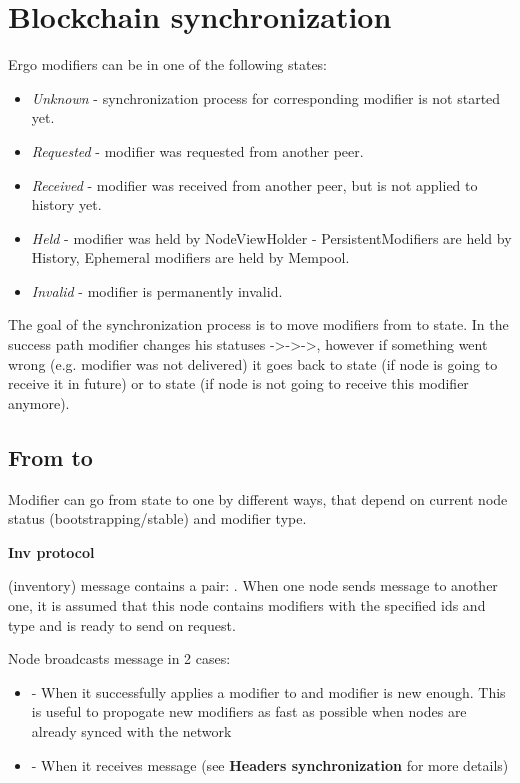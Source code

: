 
\section{Blockchain synchronization}

Ergo modifiers can be in one of the following states:

\begin{itemize}
    \item{\em Unknown} - synchronization process for corresponding modifier is not started yet.
    \item{\em Requested} - modifier was requested from another peer.
    \item{\em Received} - modifier was received from another peer, but is not applied to history yet.
    \item{\em Held} - modifier was held by NodeViewHolder - PersistentModifiers are held by History,
    Ephemeral modifiers are held by Mempool.
    \item{\em Invalid} - modifier is permanently invalid.
\end{itemize}

The goal of the synchronization process is to move modifiers from  to  state.
In the success path modifier changes his statuses ->->->,
however if something went wrong (e.g. modifier was not delivered) it goes back to  state
(if node is going to receive it in future) or to state (if node is not going to receive
this modifier anymore).

\subsection{From  to }

Modifier can go from  state to  one by different ways, that depend on
current node status (bootstrapping/stable) and modifier type.

\textbf{Inv protocol}

 (inventory) message contains a pair: .
When one node sends  message to another one, it is assumed that this node
contains modifiers with the specified ids and type and is ready to send on request.

Node broadcasts  message in 2 cases:
\begin{itemize}
    \item - When it successfully applies a modifier to  and modifier is new enough.
    This is useful to propogate new modifiers as fast as possible when nodes are already synced with the network
    \item - When it receives  message (see \textbf{Headers synchronization} for more details)
\end{itemize}

